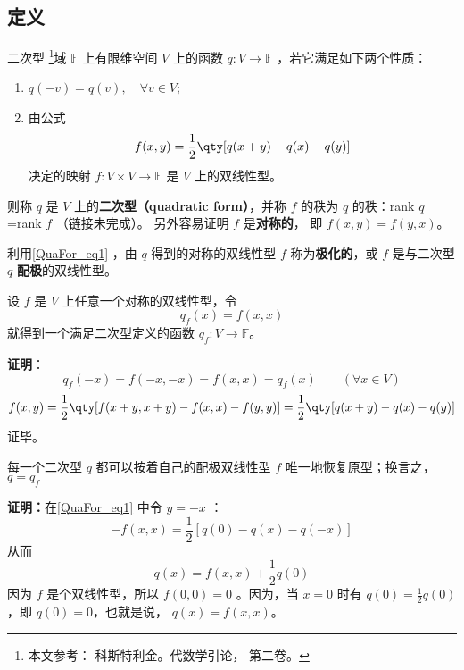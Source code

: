 
\subsection{定义}
\begin{definition}{二次型}\label{QuaFor_def2}
\footnote{本文参考： 科斯特利金。代数学引论， 第二卷。}域 $\mathbb{F}$ 上有限维空间 $V$ 上的函数 $q:V\rightarrow\mathbb{F}$ ，若它满足如下两个性质：
\begin{enumerate}
\item $q(-{v})=q( v),\quad \forall v\in V$;
\item 由公式
\begin{equation}\label{QuaFor_eq1}
f(x, y)=\frac{1}{2}\qty[q(x+ y)-q(x)-q(y)]
\end{equation}
决定的映射 $f:V\times V\rightarrow\mathbb{F}$ 是 $V$ 上的双线性型。
\end{enumerate}
则称 $q$ 是 $V$ 上的\textbf{二次型（quadratic form）}，并称 $f$ 的秩为 $q$ 的秩：rank $q$=rank $f$ （链接未完成）。 另外容易证明 $f$ 是\textbf{对称的}， 即 $f(x,y) = f(y,x)$。
\end{definition}
利用\autoref{QuaFor_eq1} ，由 $q$ 得到的对称的双线性型 $f$ 称为\textbf{极化的}，或 $f$ 是与二次型 $q$ \textbf{配极}的双线性型。
\begin{example}{}
设 $f$ 是 $V$ 上任意一个对称的双线性型，令
\begin{equation}
q_f( x)=f( x, x)
\end{equation}
就得到一个满足二次型定义的函数 $q_f:V\rightarrow\mathbb{F}$。

\textbf{证明}：
\begin{equation}
q_f(-{x})=f(-{x},-{x})=f({x},{x})=q_f({x}) \qquad (\forall x\in V)
\end{equation}
\begin{equation}
f(x, y)=\frac{1}{2}\qty[f( x+ y, x+ y)-f( x, x)-f( y, y)]
=\frac{1}{2}\qty[q(x+ y)-q(x)-q(y)]
\end{equation}
证毕。
\end{example}

\begin{theorem}{}\label{QuaFor_the1}
每一个二次型 $q$ 都可以按着自己的配极双线性型 $f$ 唯一地恢复原型；换言之， $q=q_f$
\end{theorem}
\textbf{证明：}在\autoref{QuaFor_eq1} 中令 $y=-x$ ：
\begin{equation}
-f(x,x)=\frac{1}{2}[q(0)-q(x)-q(-x)]
\end{equation}
从而
\begin{equation}
q(x)=f(x,x)+\frac{1}{2}q(0)
\end{equation}
因为 $f$ 是个双线性型，所以 $f(0,0)=0$ 。因为，当 $x=0$ 时有 $q(0)=\frac{1}{2}q(0)$ ，即 $q(0)=0$，也就是说， $q(x)=f(x,x)$。


